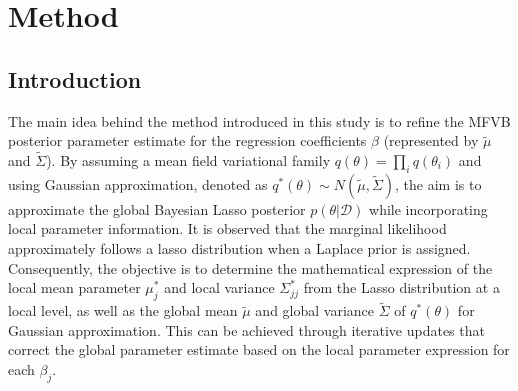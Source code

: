 \chapter{Method}
\label{Chapter3}
\section{Introduction}
The main idea behind the method introduced in this study is to refine the MFVB posterior parameter estimate for the regression coefficients $\beta$ (represented by $\tilde{\mu}$ and $\tilde{\Sigma}$). By assuming a mean field variational family $q(\theta) = \prod_i q(\theta_i)$ and using Gaussian approximation, denoted as $q^*(\theta) \sim N(\tilde{\mu},\tilde{\Sigma})$, the aim is to approximate the global Bayesian Lasso posterior $p(\theta|\mathcal{D})$ while incorporating local parameter information. It is observed that the marginal likelihood approximately follows a lasso distribution when a Laplace prior is assigned. Consequently, the objective is to determine the mathematical expression of the local mean parameter $\mu_j^{*}$ and local variance $\Sigma_{jj}^{*}$ from the Lasso distribution at a local level, as well as the global mean $\tilde{\mu}$ and global variance $\tilde{\Sigma}$ of $q^*(\theta)$ for Gaussian approximation. This can be achieved through iterative updates that correct the global parameter estimate based on the local parameter expression for each $\beta_j$.

